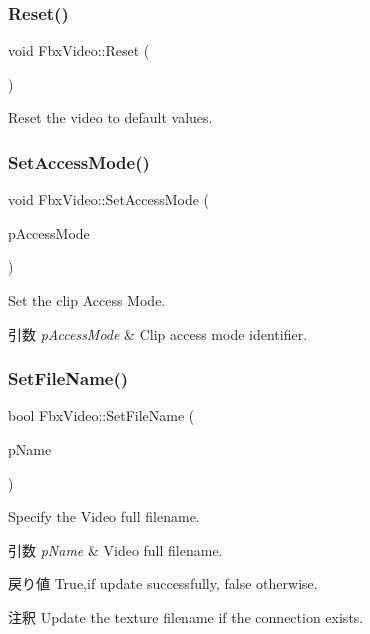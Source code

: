 \subsubsection{\texorpdfstring{Reset()}{Reset()}}
{\footnotesize\ttfamily void Fbx\+Video\+::\+Reset (\begin{DoxyParamCaption}{ }\end{DoxyParamCaption})}



Reset the video to default values. 

\mbox{\label{class_fbx_video_a7c593f34c56ecb905de956d50048a4f5}} 
\subsubsection{\texorpdfstring{Set\+Access\+Mode()}{SetAccessMode()}}
{\footnotesize\ttfamily void Fbx\+Video\+::\+Set\+Access\+Mode (\begin{DoxyParamCaption}\item[{\hyperlink{class_fbx_video_a6dd88dabb2170adcd8c58952ed2e0c40}{E\+Access\+Mode}}]{p\+Access\+Mode }\end{DoxyParamCaption})}

Set the clip Access Mode. 
\begin{DoxyParams}{引数}
{\em p\+Access\+Mode} & Clip access mode identifier. \\
\hline
\end{DoxyParams}
\mbox{\label{class_fbx_video_a897a450c62670d4730cb9ee663a26ea2}} 
\subsubsection{\texorpdfstring{Set\+File\+Name()}{SetFileName()}}
{\footnotesize\ttfamily bool Fbx\+Video\+::\+Set\+File\+Name (\begin{DoxyParamCaption}\item[{const char $\ast$}]{p\+Name }\end{DoxyParamCaption})}

Specify the Video full filename. 
\begin{DoxyParams}{引数}
{\em p\+Name} & Video full filename. \\
\hline
\end{DoxyParams}
\begin{DoxyReturn}{戻り値}
{\ttfamily True},if update successfully, {\ttfamily false} otherwise. 
\end{DoxyReturn}
\begin{DoxyRemark}{注釈}
Update the texture filename if the connection exists. 
\end{DoxyRemark}
\mbox{\label{class_fbx_video_ade24bcc804d746751c5a35c1bde50333}} 
